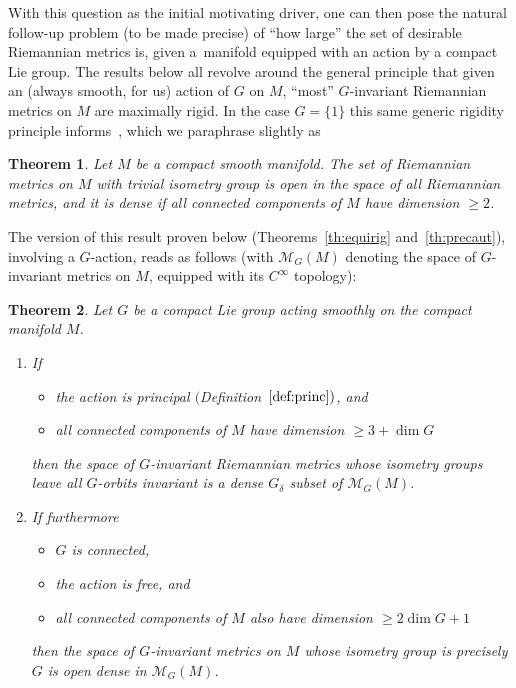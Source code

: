 \documentclass[10pt,a4paper]{amsart}
\numberwithin{equation}{section}
\newtheorem{Theorem}{Theorem}[section]
\begin{document}
With this question as the initial motivating driver, one can then pose the natural follow-up problem (to be made precise) of ``how large'' the set of desirable Riemannian metrics is, given a~manifold equipped with an action by a compact Lie group. The results below all revolve around the general principle that given an (always smooth, for us) action of $G$ on $M$, ``most'' $G$-invariant Riemannian metrics on $M$ are maximally rigid. In the case $G=\{1\}$ this same generic rigidity principle informs~\cite[Corollary~8.2 and Proposition~8.3]{eb}, which we paraphrase slightly as

\begin{Theorem}
 Let $M$ be a compact smooth manifold. The set of Riemannian metrics on $M$ with trivial isometry group is open in the space of all Riemannian metrics, and it is dense if all connected components of $M$ have dimension $\ge 2$.
\end{Theorem}

The version of this result proven below (Theorems~\ref{th:equirig} and~\ref{th:precaut}), involving a $G$-action, reads as follows (with $\mathcal{M}_G(M)$ denoting the space of $G$-invariant metrics on $M$, equipped with its $C^{\infty}$ topology):

\begin{Theorem}\label{th:summ}
 Let $G$ be a compact Lie group acting smoothly on the compact manifold $M$.
 \begin{enumerate}[$(a)$]\itemsep=0pt
 \item\label{item:21} If
 \begin{itemize}\itemsep=0pt
 \item the action is principal $($Definition~$\ref{def:princ})$, and
 \item all connected components of $M$ have dimension $\ge 3+\dim G$
 \end{itemize}
 then the space of $G$-invariant Riemannian metrics whose isometry groups leave all $G$-orbits invariant is a dense $G_{\delta}$ subset of $\mathcal{M}_G(M)$.
 \item\label{item:22} If furthermore
 \begin{itemize}\itemsep=0pt
 \item $G$ is connected,
 \item the action is free, and
 \item all connected components of $M$ also have dimension $\ge 2\dim G+1$
 \end{itemize}
 then the space of $G$-invariant metrics on $M$ whose isometry group is precisely $G$ is open dense in $\mathcal{M}_G(M)$.
 \end{enumerate}
\end{Theorem}
\end{document}

